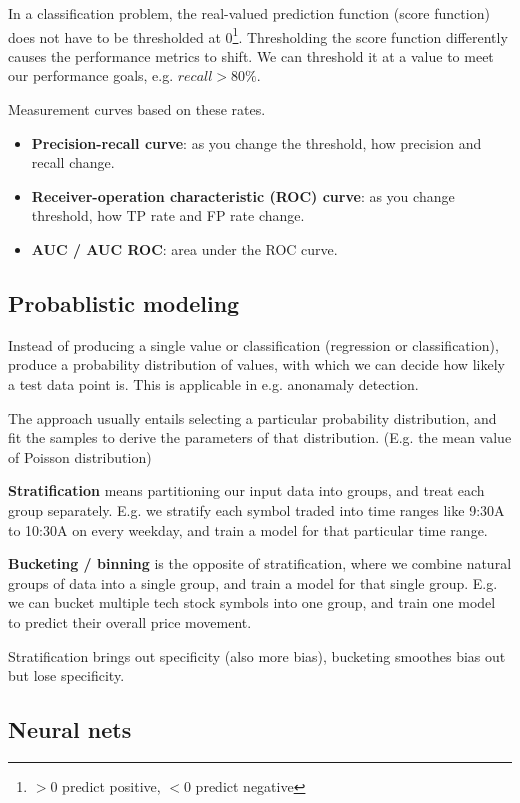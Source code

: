 \documentclass{article}
\begin{document}
In a classification problem, the real-valued prediction function (score function) does not have to be thresholded at 0\footnote{$> 0$ predict positive, $< 0$ predict negative}.
Thresholding the score function differently causes the performance metrics to shift.
We can threshold it at a value to meet our performance goals, e.g. $recall > 80\%$.

Measurement curves based on these rates.
\begin{itemize}
\item \textbf{Precision-recall curve}: as you change the threshold, how precision and recall change.
\item \textbf{Receiver-operation characteristic (ROC) curve}: as you change threshold, how TP rate and FP rate change.
\item \textbf{AUC / AUC ROC}: area under the ROC curve.
\end{itemize}

\subsection{Probablistic modeling}

Instead of producing a single value or classification (regression or classification), produce a probability distribution of values, with which we can decide how likely a test data point is.
This is applicable in e.g. anonamaly detection.

The approach usually entails selecting a particular probability distribution, and fit the samples to derive the parameters of that distribution. (E.g. the mean value of Poisson distribution)

\textbf{Stratification} means partitioning our input data into groups, and treat each group separately.
E.g. we stratify each symbol traded into time ranges like 9:30A to 10:30A on every weekday, and train a model for that particular time range.

\textbf{Bucketing / binning} is the opposite of stratification, where we combine natural groups of data into a single group, and train a model for that single group.
E.g. we can bucket multiple tech stock symbols into one group, and train one model to predict their overall price movement.

Stratification brings out specificity (also more bias), bucketing smoothes bias out but lose specificity.


\subsection{Neural nets}
\end{document}
